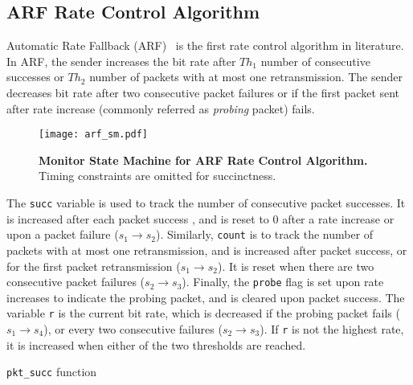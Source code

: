 \subsection{ARF Rate Control Algorithm}
\label{subsec:arf}

Automatic Rate Fallback (ARF)~\cite{kamerman1997wavelan} is the first rate
control algorithm in literature. In ARF, the sender increases the bit rate after
$Th_1$ number of consecutive successes or $Th_2$ number of packets with at most
one retransmission. The sender decreases bit rate after two consecutive packet
failures or if the first packet sent after rate increase (commonly referred as
\textit{probing} packet) fails.


\begin{figure}[t!]
  \centering
  \texttt{[image: arf\_sm.pdf]}
  \caption{\textbf{Monitor State Machine for ARF Rate Control Algorithm.} Timing
  constraints are omitted for succinctness.}
  \label{fig:arf_sm}
\end{figure}


The \texttt{succ} variable is used to track the number of consecutive packet
successes. It is increased after each packet success , and is reset to 0 after a
rate increase or upon a packet failure ($s_1\rightarrow s_2$).  Similarly,
\texttt{count} is to track the number of packets with at most one
retransmission, and is increased after packet success, or for the first packet
retransmission ($s_1\rightarrow s_2$). It is reset when there are two
consecutive packet failures ($s_2\rightarrow s_3$). Finally, the \texttt{probe}
flag is set upon rate increases to indicate the probing packet, and is cleared
upon packet success. The variable \texttt{r} is the current bit rate, which is
decreased if the probing packet fails ($s_1\rightarrow s_4$), or every two
consecutive failures ($s_2\rightarrow s_3$). If \texttt{r} is not the highest
rate, it is increased when either of the two thresholds are reached.


\begin{algorithm}[t!]
  \caption{\texttt{pkt\_succ} function}
  \label{alg:pkt_succ}
  \begin{algorithmic}[1]
    \EndIf
    \EndFunction
  \end{algorithmic}
\end{algorithm}

